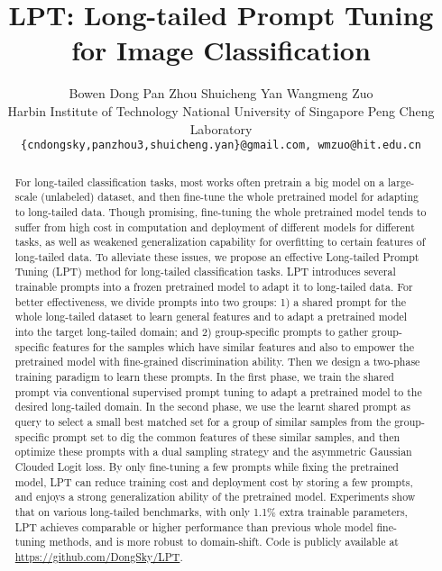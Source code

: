 \documentclass{article} \usepackage{iclr2023_conference,times}
\title{LPT: Long-tailed Prompt Tuning  for Image Classification}
\author{Bowen Dong \quad
Pan Zhou \quad
Shuicheng Yan \quad
Wangmeng Zuo\textsuperscript{\Envelope} \\
Harbin Institute of Technology  \quad National University of Singapore \quad  Peng Cheng Laboratory \\
\texttt{\{cndongsky,panzhou3,shuicheng.yan\}@gmail.com, wmzuo@hit.edu.cn} \\
}
\begin{document}
\maketitle

\begin{abstract}
For long-tailed classification tasks, most works often pretrain a big model on a large-scale (unlabeled) dataset, and then fine-tune the whole pretrained  model for  adapting to long-tailed data. Though promising, fine-tuning the whole pretrained model tends to suffer from high cost in computation and deployment of different models for different tasks, as well as weakened generalization capability for overfitting to certain features of long-tailed data. 
To alleviate these issues, we propose an effective Long-tailed Prompt Tuning (LPT) method for long-tailed classification tasks. LPT introduces several trainable prompts into a frozen pretrained model to adapt it to long-tailed data. For better effectiveness, we divide prompts into two groups: 1) a shared prompt for the whole long-tailed dataset to learn general features and to adapt a pretrained model into the target long-tailed domain; and 2) group-specific prompts to gather group-specific features for the samples which have similar features and also to empower the pretrained model with fine-grained discrimination ability. Then we design a two-phase training paradigm to learn these prompts. In the first phase, we train the shared prompt via conventional supervised prompt tuning to adapt a pretrained model to the desired long-tailed domain. In the second phase, we use the learnt shared prompt as query to select a small best matched set for a group of similar samples from the group-specific prompt set to dig the common features of these similar samples, and then optimize these prompts with a dual sampling strategy and the asymmetric Gaussian Clouded Logit loss. By only fine-tuning a few prompts while fixing the pretrained model, LPT can reduce training cost and deployment cost by storing a few prompts, and enjoys a strong generalization ability of the pretrained model. Experiments show that on various long-tailed benchmarks, with only 1.1\% extra trainable parameters, LPT achieves comparable or higher performance than previous whole model fine-tuning methods, and is more robust to domain-shift. Code is publicly available at \url{https://github.com/DongSky/LPT}. 


\end{abstract}

\vspace{-1.3em}
\end{document}
